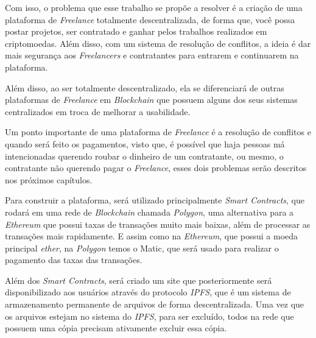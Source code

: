 Com isso, o problema que esse trabalho se propõe a resolver é a criação de uma plataforma de \textit{Freelance} totalmente descentralizada, de forma que, você possa postar projetos, ser contratado e ganhar pelos trabalhos realizados em criptomoedas. Além disso, com um sistema de resolução de conflitos, a ideia é dar mais segurança aos \textit{Freelancers} e contratantes para entrarem e continuarem na plataforma.


Além disso, ao ser totalmente descentralizado, ela se diferenciará de outras plataformas de \textit{Freelance} em \textit{Blockchain} que possuem alguns dos seus sistemas centralizados em troca de melhorar a usabilidade.

Um ponto importante de uma plataforma de \textit{Freelance} é a resolução de conflitos e quando será feito os pagamentos, visto que, é possível que haja pessoas má intencionadas querendo roubar o dinheiro de um contratante, ou mesmo, o contratante não querendo pagar o \textit{Freelance}, esses dois problemas serão descritos nos próximos capítulos.

Para construir a plataforma, será utilizado principalmente \textit{Smart Contracts}, que rodará em uma rede de \textit{Blockchain} chamada \textit{Polygon}, uma alternativa para a \textit{Ethereum} que possui taxas de transações muito mais baixas, além de processar as transações mais rapidamente. E assim como na \textit{Ethereum}, que possui a moeda principal \textit{ether}, na \textit{Polygon} temos o Matic, que será usado para realizar o pagamento das taxas das transações.\cite{polygon}

Além dos \textit{Smart Contracts}, será criado um site que posteriormente será disponibilizado aos usuários através do protocolo \textit{IPFS}, que é um sistema de armazenamento permanente de arquivos de forma descentralizada. Uma vez que os arquivos estejam no sistema do \textit{IPFS}, para ser excluído, todos na rede que possuem uma cópia precisam ativamente excluir essa cópia.\cite{ipfs}

